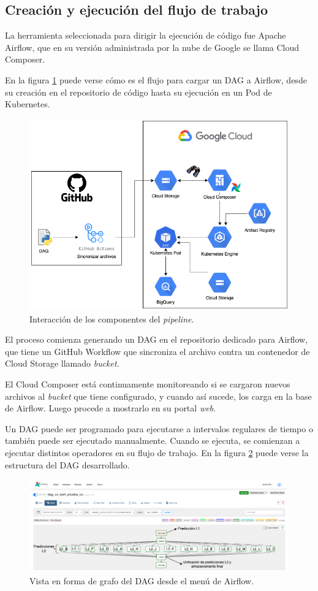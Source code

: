 \subsection{Creación y ejecución del flujo de trabajo}

La herramienta seleccionada para dirigir la ejecución de código fue Apache Airflow, que en su versión administrada por la nube de Google se llama Cloud Composer.

En la figura \ref{fig:cap3-pipeline} puede verse cómo es el flujo para cargar un DAG a Airflow, desde su creación en el repositorio de código hasta su ejecución en un Pod de Kubernetes.

\begin{figure}[H]
	\centering
	\includegraphics[width=.8\textwidth]{./Figures/cap3-pipeline.png}
	\caption{Interacción de los componentes del \textit{pipeline}.}
	\label{fig:cap3-pipeline}
\end{figure}

El proceso comienza generando un DAG en el repositorio dedicado para Airflow, que tiene un GitHub Workflow que sincroniza el archivo contra un contenedor de Cloud Storage llamado \textit{bucket}. 

El Cloud Composer está continuamente monitoreando si se cargaron nuevos archivos al \textit{bucket} que tiene configurado, y cuando así sucede, los carga en la base de Airflow. Luego procede a mostrarlo en su portal \textit{web}.

Un DAG puede ser programado para ejecutarse a intervalos regulares de tiempo o también puede ser ejecutado manualmente. Cuando se ejecuta, se comienzan a ejecutar distintos operadores en su flujo de trabajo. En la figura \ref{fig:cap3-dag} puede verse la estructura del DAG desarrollado.

\begin{figure}[H]
	\centering
	\includegraphics[width=1\textwidth]{./Figures/cap3-dag.png}
	\caption{Vista en forma de grafo del DAG desde el menú de Airflow.}
	\label{fig:cap3-dag}
\end{figure}

